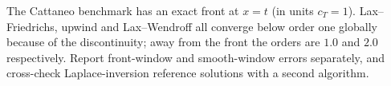 \begin{summarybox}[Summary]
The Cattaneo benchmark has an exact front at $x=t$ (in units $c_T=1$). Lax--Friedrichs, upwind and Lax--Wendroff all converge below order one globally because of the discontinuity; away from the front the orders are $1.0$ and $2.0$ respectively. Report front-window and smooth-window errors separately, and cross-check Laplace-inversion reference solutions with a second algorithm.
\end{summarybox}
